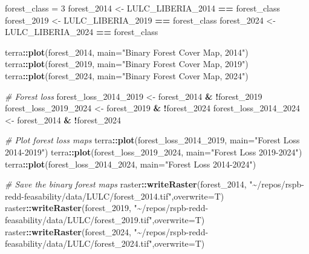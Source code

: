 \documentclass[
]{article}
\newenvironment{Shaded}{\begin{snugshade}}{\end{snugshade}}
\newcommand{\AttributeTok}[1]{\textcolor[rgb]{0.13,0.29,0.53}{#1}}
\newcommand{\CommentTok}[1]{\textcolor[rgb]{0.56,0.35,0.01}{\textit{#1}}}
\newcommand{\DecValTok}[1]{\textcolor[rgb]{0.00,0.00,0.81}{#1}}
\newcommand{\FunctionTok}[1]{\textcolor[rgb]{0.13,0.29,0.53}{\textbf{#1}}}
\newcommand{\NormalTok}[1]{#1}
\newcommand{\OtherTok}[1]{\textcolor[rgb]{0.56,0.35,0.01}{#1}}
\newcommand{\SpecialCharTok}[1]{\textcolor[rgb]{0.81,0.36,0.00}{\textbf{#1}}}
\newcommand{\StringTok}[1]{\textcolor[rgb]{0.31,0.60,0.02}{#1}}
\begin{document}
\begin{Shaded}
\begin{Highlighting}[]
\NormalTok{forest\_class }\OtherTok{=} \DecValTok{3}
\NormalTok{forest\_2014 }\OtherTok{\textless{}{-}}\NormalTok{ LULC\_LIBERIA\_2014 }\SpecialCharTok{==}\NormalTok{ forest\_class}
\NormalTok{forest\_2019 }\OtherTok{\textless{}{-}}\NormalTok{ LULC\_LIBERIA\_2019 }\SpecialCharTok{==}\NormalTok{ forest\_class}
\NormalTok{forest\_2024 }\OtherTok{\textless{}{-}}\NormalTok{ LULC\_LIBERIA\_2024 }\SpecialCharTok{==}\NormalTok{ forest\_class}

\NormalTok{terra}\SpecialCharTok{::}\FunctionTok{plot}\NormalTok{(forest\_2014, }\AttributeTok{main=}\StringTok{"Binary Forest Cover Map, 2014"}\NormalTok{)}
\NormalTok{terra}\SpecialCharTok{::}\FunctionTok{plot}\NormalTok{(forest\_2019, }\AttributeTok{main=}\StringTok{"Binary Forest Cover Map, 2019"}\NormalTok{)}
\NormalTok{terra}\SpecialCharTok{::}\FunctionTok{plot}\NormalTok{(forest\_2024, }\AttributeTok{main=}\StringTok{"Binary Forest Cover Map, 2024"}\NormalTok{)}

\CommentTok{\# Forest loss}
\NormalTok{forest\_loss\_2014\_2019 }\OtherTok{\textless{}{-}}\NormalTok{ forest\_2014 }\SpecialCharTok{\&} \SpecialCharTok{!}\NormalTok{forest\_2019}
\NormalTok{forest\_loss\_2019\_2024 }\OtherTok{\textless{}{-}}\NormalTok{ forest\_2019 }\SpecialCharTok{\&} \SpecialCharTok{!}\NormalTok{forest\_2024}
\NormalTok{forest\_loss\_2014\_2024 }\OtherTok{\textless{}{-}}\NormalTok{ forest\_2014 }\SpecialCharTok{\&} \SpecialCharTok{!}\NormalTok{forest\_2024}

\CommentTok{\# Plot forest loss maps}
\NormalTok{terra}\SpecialCharTok{::}\FunctionTok{plot}\NormalTok{(forest\_loss\_2014\_2019, }\AttributeTok{main=}\StringTok{"Forest Loss 2014{-}2019"}\NormalTok{)}
\NormalTok{terra}\SpecialCharTok{::}\FunctionTok{plot}\NormalTok{(forest\_loss\_2019\_2024, }\AttributeTok{main=}\StringTok{"Forest Loss 2019{-}2024"}\NormalTok{)}
\NormalTok{terra}\SpecialCharTok{::}\FunctionTok{plot}\NormalTok{(forest\_loss\_2014\_2024, }\AttributeTok{main=}\StringTok{"Forest Loss 2014{-}2024"}\NormalTok{)}

\CommentTok{\# Save the binary forest maps}
\NormalTok{raster}\SpecialCharTok{::}\FunctionTok{writeRaster}\NormalTok{(forest\_2014, }\StringTok{"\textasciitilde{}/repos/rspb{-}redd{-}feasability/data/LULC/forest\_2014.tif"}\NormalTok{,}\AttributeTok{overwrite=}\NormalTok{T)}
\NormalTok{raster}\SpecialCharTok{::}\FunctionTok{writeRaster}\NormalTok{(forest\_2019, }\StringTok{"\textasciitilde{}/repos/rspb{-}redd{-}feasability/data/LULC/forest\_2019.tif"}\NormalTok{,}\AttributeTok{overwrite=}\NormalTok{T)}
\NormalTok{raster}\SpecialCharTok{::}\FunctionTok{writeRaster}\NormalTok{(forest\_2024, }\StringTok{"\textasciitilde{}/repos/rspb{-}redd{-}feasability/data/LULC/forest\_2024.tif"}\NormalTok{,}\AttributeTok{overwrite=}\NormalTok{T)}


\end{Highlighting}
\end{Shaded}
\end{document}
